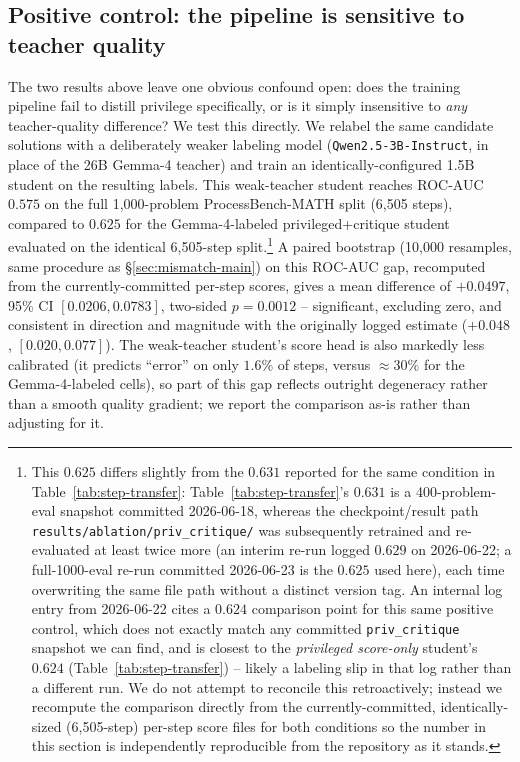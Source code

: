 \documentclass[11pt]{article}
\begin{document}
\subsection{Positive control: the pipeline is sensitive to teacher quality}
\label{sec:positive-control}
The two results above leave one obvious confound open: does the training
pipeline fail to distill privilege specifically, or is it simply
insensitive to \emph{any} teacher-quality difference? We test this directly.
We relabel the same candidate solutions with a deliberately weaker labeling
model (\texttt{Qwen2.5-3B-Instruct}, in place of the 26B Gemma-4 teacher)
and train an identically-configured 1.5B student on the resulting labels.
This weak-teacher student reaches ROC-AUC $0.575$ on the full 1{,}000-problem
ProcessBench-MATH split (6{,}505 steps), compared to $0.625$ for the
Gemma-4-labeled privileged+critique student evaluated on the identical
6{,}505-step split.\footnote{This $0.625$ differs slightly from the $0.631$
reported for the same condition in Table~\ref{tab:step-transfer}: Table~\ref{tab:step-transfer}'s
$0.631$ is a 400-problem-eval snapshot committed 2026-06-18, whereas the
checkpoint/result path \texttt{results/ablation/priv\_critique/} was
subsequently retrained and re-evaluated at least twice more (an interim
re-run logged $0.629$ on 2026-06-22; a full-1000-eval re-run committed
2026-06-23 is the $0.625$ used here), each time overwriting the same file
path without a distinct version tag. An internal log entry from
2026-06-22 cites a $0.624$ comparison point for this same positive control,
which does not exactly match any committed \texttt{priv\_critique} snapshot
we can find, and is closest to the \emph{privileged score-only} student's
$0.624$ (Table~\ref{tab:step-transfer}) -- likely a labeling slip in that
log rather than a different run. We do not attempt to reconcile this
retroactively; instead we recompute the comparison directly from the
currently-committed, identically-sized (6{,}505-step) per-step score files
for both conditions so the number in this section is independently
reproducible from the repository as it stands.} A paired bootstrap
(10{,}000 resamples, same procedure as \S\ref{sec:mismatch-main}) on this
ROC-AUC gap, recomputed from the currently-committed per-step scores, gives
a mean difference of $+0.0497$, 95\% CI $[0.0206, 0.0783]$, two-sided
$p=0.0012$ -- significant, excluding zero, and consistent in direction and
magnitude with the originally logged estimate ($+0.048$,
$[0.020, 0.077]$). The weak-teacher student's score head is also markedly
less calibrated (it predicts ``error'' on only $1.6\%$ of steps, versus
$\approx 30\%$ for the Gemma-4-labeled cells), so part of this gap reflects
outright degeneracy rather than a smooth quality gradient; we report the
comparison as-is rather than adjusting for it.
\end{document}
